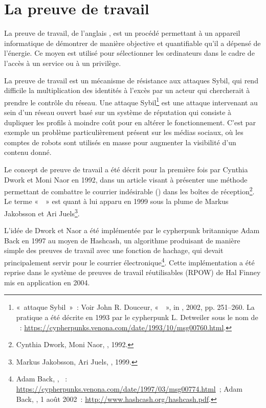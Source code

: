 
\section*{La preuve de travail}


La preuve de travail, de l'anglais , est un procédé permettant à un appareil informatique de démontrer de manière objective et quantifiable qu'il a dépensé de l'énergie. Ce moyen est utilisé pour sélectionner les ordinateurs dans le cadre de l'accès à un service ou à un privilège.

La preuve de travail est un mécanisme de résistance aux attaques Sybil, qui rend difficile la multiplication des identités à l'excès par un acteur qui chercherait à prendre le contrôle du réseau. Une attaque Sybil\footnote{«~attaque Sybil~»~: Voir John R. Douceur, «~~», in , 2002, pp. 251--260. La pratique a été décrite en 1993 par le cypherpunk L. Detweiler sous le nom de ~: \url{https://cypherpunks.venona.com/date/1993/10/msg00760.html}.} est une attaque intervenant au sein d'un réseau ouvert basé sur un système de réputation qui consiste à dupliquer les profils à moindre coût pour en altérer le fonctionnement. C'est par exemple un problème particulièrement présent sur les médias sociaux, où les comptes de robots sont utilisés en masse pour augmenter la visibilité d'un contenu donné. %

Le concept de preuve de travail a été décrit pour la première fois par Cynthia Dwork et Moni Naor en 1992, dans un article visant à présenter une méthode permettant de combattre le courrier indésirable () dans les boîtes de réception\footnote{Cynthia Dwork, Moni Naor, , 1992.}. Le terme «~~» est quant à lui apparu en 1999 sous la plume de Markus Jakobsson et Ari Juels\footnote{Markus Jakobsson, Ari Juels, , 1999.}.

L'idée de Dwork et Naor a été implémentée par le cypherpunk britannique Adam Back en 1997 au moyen de Hashcash, un algorithme produisant de manière simple des preuves de travail avec une fonction de hachage, qui devait principalement servir pour le courrier électronique\footnote{Adam Back, , ~: \url{https://cypherpunks.venona.com/date/1997/03/msg00774.html}~; Adam Back, , 1\ier{} août 2002~: \url{http://www.hashcash.org/hashcash.pdf}.}. Cette implémentation a été reprise dans le système de preuves de travail réutilisables (RPOW) de Hal Finney mis en application en 2004. %

